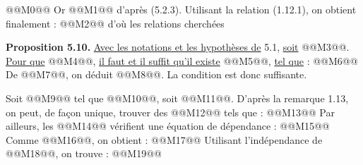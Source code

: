 
@@M0@@
Or @@M1@@ d'après (5.2.3).
Utilisant la relation (1.12.1), on obtient finalement :
@@M2@@
d'où les relations cherchées

\textbf{Proposition 5.10.} \uline{Avec les notations et les hypothèses de} 5.1, \uline{soit} @@M3@@. \uline{Pour que} @@M4@@, \uline{il faut et il suffit qu'il existe} @@M5@@, \uline{tel que} :
@@M6@@
De @@M7@@, on déduit @@M8@@. La condition est donc suffisante.

Soit @@M9@@ tel que @@M10@@, soit @@M11@@. D'après la remarque 1.13, on peut, de façon unique, trouver des @@M12@@ tels que :
@@M13@@
Par ailleurs, les @@M14@@ vérifient une équation de dépendance :
@@M15@@
Comme @@M16@@, on obtient :
@@M17@@
Utilisant l'indépendance de @@M18@@, on trouve :
@@M19@@
